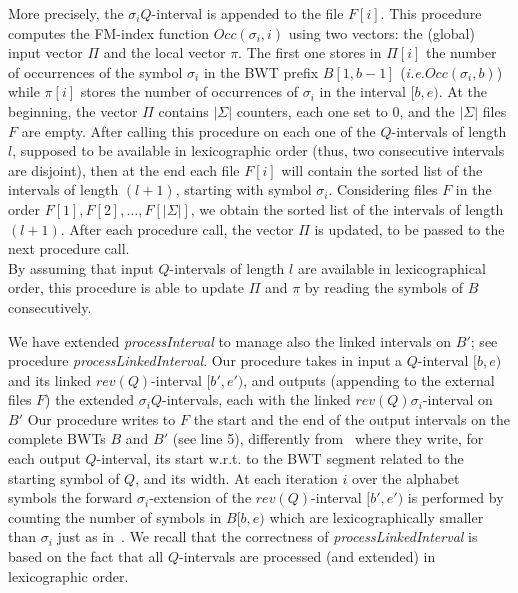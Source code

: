 \documentclass[runningheads,envcountsame,a4paper]{llncs}
\newcommand{\notaestesa}[2]{%
 \marginpar{\color{red!75!black}\textbf{\texttimes}}%
 {\color{red!75!black}%
 [\,\textbullet\,\textsf{\textbf{#1:}} %
 \textsf{\footnotesize#2}\,\textbullet\,]}%
}
\newcommand{\ie}{\textit{i.e.}\xspace}
\newcommand{\wrt}{w.r.t.\xspace}
\begin{document}
More precisely, the $\sigma_i Q$-interval is appended to the file $F[i]$.
This procedure computes the FM-index function $Occ(\sigma_i, i)$ using two
vectors: the (global) input vector $\Pi$ and the local vector $\pi$.
The first one stores in $\Pi[i]$ the number of occurrences of  the symbol
$\sigma_i$ in the BWT prefix $B[1,b-1]$ (\ie $Occ(\sigma_{i}, b)$) while $\pi[i]$ stores the number of occurrences of $\sigma_i$ in the interval $[b,e)$. At the beginning, the vector $\Pi$ contains $|\Sigma|$ counters, each one set to $0$, and the $|\Sigma|$ files $F$ are empty.
After calling this procedure on each one of the $Q$-intervals of length $l$, supposed to be available in lexicographic order (thus, two consecutive intervals are disjoint), then  at the end each file $F[i]$ will contain the sorted list of the intervals of length $(l+1)$, starting with symbol $\sigma_i$. Considering files $F$ in the order $F[1], F[2], \ldots ,F[|\Sigma|]$, we obtain the sorted list of the intervals of length $(l+1)$. After each procedure call, the vector $\Pi$ is updated, to be passed to the next procedure call.\\
By assuming that input $Q$-intervals of length $l$ are available in lexicographical order, this procedure is able to update $\Pi$ and $\pi$ by reading the symbols of $B$ consecutively.

We have extended \emph{processInterval} to manage also the linked intervals on
$B'$; see procedure \emph{processLinkedInterval}.
Our procedure takes in input a $Q$-interval $[b,e)$ and its linked
$rev(Q)$-interval $[b',e')$, and outputs (appending to the external files $F$)
the extended $\sigma_i Q$-intervals, each  with the linked $rev(Q)
\sigma_i$-interval on $B'$
Our procedure writes to $F$ the start and the end of the output intervals on the
complete BWTs $B$ and $B'$ (see line 5), differently from~\cite{Cox2012} where they write, for each output $Q$-interval, its start \wrt to the BWT segment related to the starting symbol of $Q$, and its width.
At each iteration $i$ over the alphabet symbols the forward $\sigma_i$-extension
of the $rev(Q)$-interval $[b',e')$ is performed by counting
the number of symbols in $B[b,e)$ which are lexicographically smaller than
$\sigma_i$ just as in~\cite{Simpson2010}.
We recall that the correctness of \emph{processLinkedInterval} is based on the
fact that all $Q$-intervals are processed (and extended) in lexicographic order.

\end{document}

